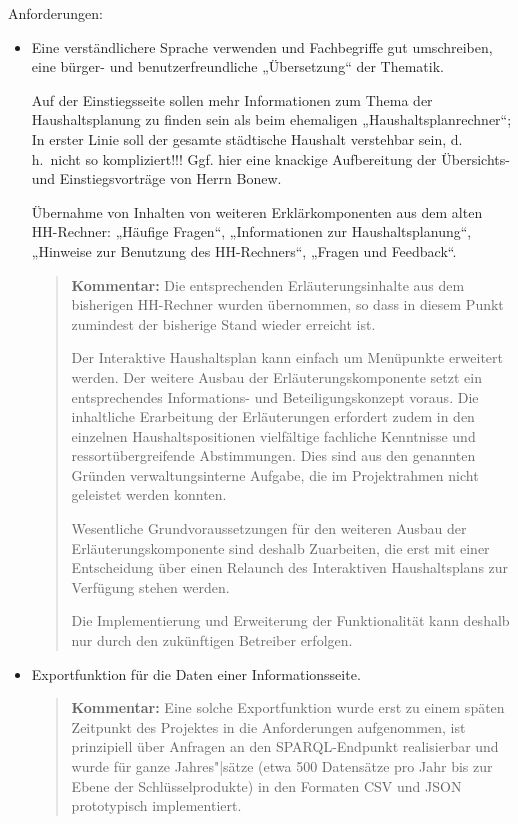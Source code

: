 \documentclass[11pt,a4paper,twoside]{article}
\newcommand{\kommentar}[1]{\begin{quote}\textbf{Kommentar:} #1 \end{quote}}
\begin{document}
Anforderungen:
\begin{itemize}\itemsep0pt
\item Eine verständlichere Sprache verwenden und Fachbegriffe gut umschreiben,
  eine bürger- und benutzerfreundliche „Übersetzung“ der Thematik.

  Auf der Einstiegsseite sollen mehr Informationen zum Thema der
  Haushaltsplanung zu finden sein als beim ehemaligen „Haushaltsplanrechner“;
  In erster Linie soll der gesamte städtische Haushalt verstehbar sein,
  d.\,h.\ nicht so kompliziert!!! Ggf. hier eine knackige Aufbereitung der
  Übersichts- und Einstiegsvorträge von Herrn Bonew. 

  Übernahme von Inhalten von weiteren Erklärkomponenten aus dem alten
  HH-Rechner: „Häufige Fragen“, „Informationen zur Haushaltsplanung“, „Hinweise
  zur Benutzung des HH-Rechners“, „Fragen und Feedback“.

  \kommentar{Die entsprechenden Erläuterungsinhalte aus dem bisherigen
    HH-Rechner wurden übernommen, so dass in diesem Punkt zumindest der
    bisherige Stand wieder erreicht ist.

    Der Interaktive Haushaltsplan kann einfach um Menüpunkte erweitert werden.
    Der weitere Ausbau der Erläuterungskomponente setzt ein entsprechendes
    Informations- und Beteiligungskonzept voraus. Die inhaltliche Erarbeitung
    der Erläuterungen erfordert zudem in den einzelnen Haushaltspositionen
    vielfältige fachliche Kenntnisse und ressortübergreifende
    Abstimmungen. Dies sind aus den genannten Gründen verwaltungsinterne
    Aufgabe, die im Projektrahmen nicht geleistet werden konnten.

    Wesentliche Grundvoraussetzungen für den weiteren Ausbau der
    Erläuterungskomponente sind deshalb Zuarbeiten, die erst mit einer
    Entscheidung über einen Relaunch des Interaktiven Haushaltsplans zur
    Verfügung stehen werden. 

    Die Implementierung und Erweiterung der Funktionalität kann deshalb nur
    durch den zukünftigen Betreiber erfolgen.}

\item Exportfunktion für die Daten einer Informationsseite.

\kommentar{Eine solche Exportfunktion wurde erst zu einem späten Zeitpunkt des
  Projektes in die Anforderungen aufgenommen, ist prinzipiell über Anfragen an
  den SPARQL-Endpunkt realisierbar und wurde für ganze Jahres"|sätze (etwa 500
  Datensätze pro Jahr bis zur Ebene der Schlüsselprodukte) in den Formaten CSV
  und JSON prototypisch implementiert. }

\end{itemize}
\end{document}
